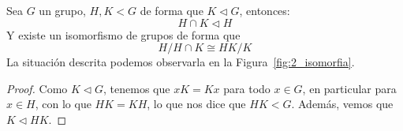 \begin{teo}\label{teo:2_isomorfia}
    Sea $G$ un grupo, $H,K<G$ de forma que $K\lhd G$, entonces:
    \begin{equation*}
        H\cap K \lhd H
    \end{equation*}
    Y existe un isomorfismo de grupos de forma que
    \begin{equation*}
        H/H\cap K \cong HK/K
    \end{equation*}
    La situación descrita podemos observarla en la Figura~\ref{fig:2_isomorfia}.
    \begin{proof}
        Como $K \lhd G$, tenemos que $xK=Kx$ para todo $x\in G$, en particular para $x\in H$, con lo que $HK = KH$, lo que nos dice que $HK < G$. Además, vemos que $K\lhd HK$. %


\end{proof}
\end{teo}
